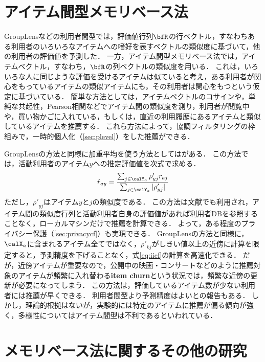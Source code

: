 \section{アイテム間型メモリベース法}
\label{sec:item-item}

GroupLensなどの利用者間型では，評価値行列$\bfR$の行ベクトル，すなわちある利用者のいろいろなアイテムへの嗜好を表すベクトルの類似度に基づいて，他の利用者の評価値を予測した．
一方，アイテム間型メモリベース法では，アイテムベクトル，すなわち，$\bfR$の列ベクトルの類似度を用いる．
これは，いろいろな人に同じような評価を受けるアイテムは似ていると考え，ある利用者が関心をもっているアイテムの類似アイテムにも，その利用者は関心をもつという仮定に基づいている．
簡単な方法としては，アイテムベクトルのコサイン\cite{ieeem:03:01}や，単純な共起性\cite{www:07:01}，Pearson相関などでアイテム間の類似度を測り，利用者が閲覧中や，買い物かごに入れている，もしくは，直近の利用履歴にあるアイテムと類似しているアイテムを推薦する．
これら方法によって，協調フィルタリングの枠組みで，一時的個人化（\ref{sec:plevel}）をした推薦ができる．

GroupLensの方法と同様に加重平均を使う方法としては\cite{www:01:02}がある．
この方法では，活動利用者のアイテム$y$への推定評価値を次式で求める．
\begin{equation}
\hat{r}_{ay}=
\frac{\sum_{j\in\calY_a}\rho'_{yj}r_{aj}}{\sum_{j\in\calY_a}|\rho'_{yj}|}
\label{eq:iicf}
\end{equation}
ただし，${\rho'}_{yj}$はアイテム$y$と$j$の類似度である．
この方法は文献\cite{kdd:04:11}でも利用され，アイテム間の類似度行列と活動利用者自身の評価値があれば利用者DBを参照することなく，ローカルマシンだけで推薦を計算できる．
よって，ある程度のプライバシー保護（\ref{sec:privacycf}）も実現できる．
GroupLensの方法と同様に，$\calX_a$に含まれるアイテム全てではなく，${\rho'}_{kj}$がしきい値以上の近傍に計算を限定すると，予測精度を下げることなく，式\eqref{eq:iicf}の計算を高速化できる．
だが，近傍アイテムが重要なので，公開中の映画・コンサートなどのように推薦対象のアイテムが頻繁に入れ替わる\textbf{item churn}という状況では，頻繁な近傍の更新が必要になってしまう．
この方法は，評価しているアイテム数が少ない利用者には推薦が早くできる．
利用者間型より予測精度はよいとの報告もある．
しかし，理論的根拠はないが，実験的には特定のアイテムに推薦が偏る傾向が強く\cite{sigchi:06:01}，多様性についてはアイテム間型は不利であるといわれている．

\section{メモリベース法に関するその他の研究}
\label{sec:other-memory-based}

